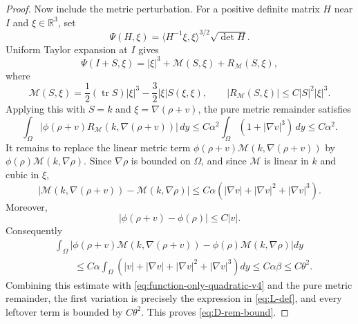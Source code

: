 \documentclass[10pt,a4paper]{amsart}
\newcommand{\R}{\mathbb R}
\newcommand{\ip}[2]{\langle #1,#2\rangle}
\newcommand{\rhoE}{\rho}
\newcommand{\tr}{\operatorname{tr}}
\begin{document}
\begin{proof}
Now include the metric perturbation.  For a positive definite matrix $H$ near $I$ and $\xi\in\R^3$, set
$$
        \Psi(H,\xi)=\ip{H^{-1}\xi}{\xi}^{3/2}\sqrt{\det H}.
$$
Uniform Taylor expansion at $I$ gives
\begin{equation}\label{eq:Psi-Taylor-v4}
        \Psi(I+S,\xi)=|\xi|^3+\mathcal M(S,\xi)+R_{\mathcal M}(S,\xi),
\end{equation}
where
$$
        \mathcal M(S,\xi)=\frac12(\tr S)|\xi|^3
        -\frac32|\xi|S(\xi,\xi),
        \qquad
        |R_{\mathcal M}(S,\xi)|\le C|S|^2|\xi|^3.
$$
Applying this with $S=k$ and $\xi=\nabla(\rhoE+v)$, the pure metric remainder satisfies
$$
        \int_\Omega |\phi(\rhoE+v)R_{\mathcal M}(k,\nabla(\rhoE+v))|\,dy
        \le C\alpha^2\int_\Omega (1+|\nabla v|^3)\,dy
        \le C\alpha^2.
$$
It remains to replace the linear metric term
$\phi(\rhoE+v)\mathcal M(k,\nabla(\rhoE+v))$ by
$\phi(\rhoE)\mathcal M(k,\nabla\rhoE)$.  Since $\nabla\rhoE$ is bounded on $\Omega$, and since $\mathcal M$ is linear in $k$ and cubic in $\xi$,
\begin{equation}\label{eq:M-Lipschitz-v4}
        |\mathcal M(k,\nabla(\rhoE+v))-\mathcal M(k,\nabla\rhoE)|
        \le C\alpha(|\nabla v|+|\nabla v|^2+|\nabla v|^3).
\end{equation}
Moreover,
$$
        |\phi(\rhoE+v)-\phi(\rhoE)|\le C|v|.
$$
Consequently
$$
\begin{aligned}
        &\int_\Omega \left|
        \phi(\rhoE+v)\mathcal M(k,\nabla(\rhoE+v))
        -\phi(\rhoE)\mathcal M(k,\nabla\rhoE)
        \right|dy                                                \\
        &\qquad \le C\alpha\int_\Omega
        (|v|+|\nabla v|+|\nabla v|^2+|\nabla v|^3)dy
        \le C\alpha\beta\le C\theta^2.
\end{aligned}
$$
Combining this estimate with \eqref{eq:function-only-quadratic-v4} and the pure metric remainder, the first variation is precisely the expression in \eqref{eq:L-def}, and every leftover term is bounded by $C\theta^2$.  This proves \eqref{eq:D-rem-bound}.
\end{proof}
\end{document}
